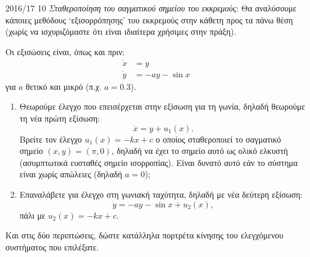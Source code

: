 \begin{exercise}{2016/17 10}
    \emph{Σταθεροποίηση του σαγματικού σημείου του εκκρεμούς}: Θα αναλύσουμε
    κάποιες μεθόδους \enquote*{εξισορρόπησης} του εκκρεμούς στην κάθετη προς τα
    πάνω θέση (χωρίς να ισχυριζόμαστε ότι είναι ιδιαίτερα χρήσιμες στην πράξη).

    Οι εξισώσεις είναι, όπως και πριν:
    \begin{align*}
        \dot{x} &= y \\
        \dot{y} &= -a y - \sin{x}
    \end{align*}
    για \( a \) θετικό και μικρό (π.χ. \( a = 0.3 \)).
    \begin{enumerate}[label= (\alph*)]
        \item Θεωρούμε έλεγχο που επεισέρχεται στην εξίσωση για τη γωνία, δηλαδή
            θεωρούμε τη νέα πρώτη εξίσωση:
            \[
                \dot{x} = y + u_1(x).
            \]
            Βρείτε τον έλεγχο \( u_1(x) = -kx + c \) ο οποίος σταθεροποιεί το
            σαγματικό σημείο \( (x, y) = (\pi, 0) \), δηλαδή να έχει το σημείο
            αυτό ως ολικό ελκυστή (ασυμπτωτικά ευσταθές σημείο ισορροπίας).
            Είναι δυνατό αυτό εάν το σύστημα είναι χωρίς απώλειες
            (δηλαδή \( a = 0 \));
        \item Επαναλάβετε για έλεγχο στη γωνιακή ταχύτητα, δηλαδή με νέα δεύτερη
            εξίσωση:
            \[
                \dot{y} = -ay -\sin{x} + u_2(x),
            \]
            πάλι με \( u_2(x) = -kx + c \).
    \end{enumerate}
    Και στις δύο περιπτώσεις, δώστε κατάλληλα πορτρέτα κίνησης του ελεγχόμενου
    συστήματος που επιλέξατε.
\end{exercise}
